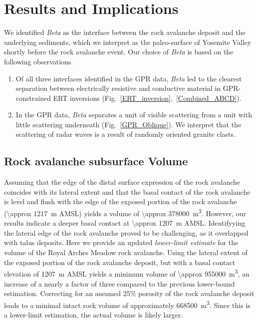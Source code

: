 \documentclass[utf8]{frontiersSCNS}
\begin{document}
\section{Results and Implications}\label{sec:results}

We identified \emph{Beta} as the interface between the rock avalanche deposit and the underlying sediments, which we interpret as the paleo-surface of Yosemite Valley shortly before the rock avalanche event. Our choice of \emph{Beta} is based on the following observations.

\begin{enumerate}
\item Of all three interfaces identified in the GPR data, \emph{Beta} led to the clearest separation between electrically resistive and conductive material in GPR-constrained ERT inversions (Fig.~\ref{ERT_inversion},~\ref{Combined_ABCD}).
\item In the GPR data, \emph{Beta} separates a unit of visible scattering from a unit with little scattering underneath (Fig.~\ref{GPR_Oblique}). We interpret that the scattering of radar waves is a result of randomly oriented granite clasts. 
\end{enumerate}


\subsection {Rock avalanche subsurface Volume}

Assuming that the edge of the distal surface expression of the rock avalanche coincides with its lateral extent and  that the basal contact of the rock avalanche is level and flush with the edge of the exposed portion of the rock avalanche (\SI{\approx 1217}{m} AMSL) yields a volume of \SI{\approx 378000}{m^3}. However, our results indicate a deeper basal contact at \SI{\approx 1207}{m} AMSL. Identifyying the lateral edge of the rock avalanche proved to be challenging, as it overlapped with talus deposits. Here we provide an updated \emph{lower-limit estimate} for the volume of the Royal Arches Meadow rock avalanche. Using the lateral extent of the exposed portion of the rock avalanche deposit, but with a basal contact elevation of \SI{1207}{m} AMSL yields a minimum volume of \SI{\approx 955000}{m^3}, an increase of a nearly a factor of three compared to the previous lower-bound estimation. Correcting for an assumed 25\% porosity of the rock avalanche deposit \cite[e.g.'][]{hutchinson2006massive, stock2010catastrophic} leads to a minimal intact rock volume of approximately \SI{668500}{m^3}. Since this is a lower-limit estimation, the actual volume is likely larger.
\end{document}
